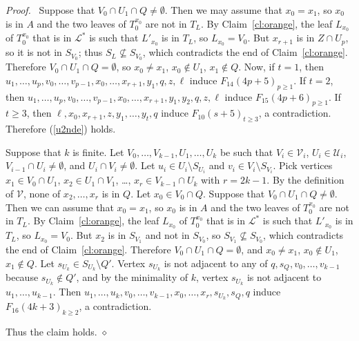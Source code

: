 \documentclass[11pt]{article}
\newenvironment{proofcl}{\noindent \emph{Proof.}\ }{Thus the claim
holds.  \hfill $\diamond$\vspace{1em}}
\begin{document}
\begin{proofcl}
Suppose that $V_0\cap U_1\cap Q\neq\emptyset$.  Then we may assume
that $x_0=x_1$, so $x_0$ is in $A$ and the two leaves of $T_0^{x_0}$
are not in $T_L$.  By Claim~\ref{cl:orange}, the leaf $L_{x_0}$ of
$T_0^{x_0}$ that is in $\mathcal L^*$ is such that $L'_{x_0}$ is in
$T_L$, so $L_{x_0}=V_0$.  But $x_{r+1}$ is in $Z\cap U_p$, so it is
not in $S_{V_0}$; thus $S_L\nsubseteq S_{V_0}$, which contradicts the
end of Claim~\ref{cl:orange}.  Therefore $V_0\cap U_1\cap Q=
\emptyset$, so $x_0\neq x_1$, $x_0\notin U_1$, $x_1\notin Q$.  Now, if
$t=1$, then $u_1, \ldots, u_p, v_0, \ldots, v_{p-1}, x_0, \ldots,
x_{r+1}, y_1, q, z, \ell$ induce $F_{14}(4p+5)_{p\geq 1}$.  If $t=2$,
then $u_1, \ldots, u_p, v_0, \ldots, v_{p-1}, x_0, \ldots, x_{r+1},
y_1, y_2, q, z, \ell$ induce $F_{15}(4p+6)_{p\geq 1}$.  If $t\geq 3$,
then $\ell, x_0, x_{r+1}, z, y_1, \ldots, y_t, q$ induce
$F_{10}(s+5)_{t\geq 3}$, a contradiction.  Therefore (\ref{u2nde})
holds.

\medskip

Suppose that $k$ is finite.  Let $V_0, \ldots, V_{k-1}, U_1, \ldots,
U_k$ be such that $V_i\in\mathcal V_i$, $U_i\in\mathcal U_i$,
$V_{i-1}\cap U_i \neq \emptyset$, and $U_i\cap V_i\neq \emptyset$.
Let $u_i\in U_i \setminus S_{U_i}$ and $v_i \in V_i \setminus
S_{V_i}$.  Pick vertices $x_1\in V_0\cap U_1$, $x_2\in U_1\cap V_1$,
\ldots, $x_r\in V_{k-1}\cap U_k$ with $r=2k-1$.  By the definition of
$\mathcal V$, none of $x_2, \ldots, x_r$ is in $Q$.  Let $x_0\in
V_0\cap Q$.  Suppose that $V_0\cap U_1\cap Q\neq\emptyset$.  Then we
can assume that $x_0=x_1$, so $x_0$ is in $A$ and the two leaves of
$T_0^{x_0}$ are not in $T_L$.  By Claim~\ref{cl:orange}, the leaf
$L_{x_0}$ of $T_0^{x_0}$ that is in $\mathcal L^*$ is such that
$L'_{x_0}$ is in $T_L$, so $L_{x_0}=V_0$.  But $x_2$ is in $S_{V_1}$
and not in $S_{V_0}$, so $S_{V_1}\nsubseteq S_{V_0}$, which
contradicts the end of Claim~\ref{cl:orange}.  Therefore $V_0\cap
U_1\cap Q=\emptyset$, and $x_0\neq x_1$, $x_0\notin U_1$, $x_1\notin
Q$.  Let $s_{U_k}\in S_{U_k}\setminus Q'$.  Vertex $s_{U_k}$ is not
adjacent to any of $q, s_Q, v_0, \ldots, v_{k-1}$ because
$s_{U_k}\notin Q'$, and by the minimality of $k$, vertex $s_{U_k}$ is
not adjacent to $u_1, \ldots, u_{k-1}$.  Then $u_1, \ldots, u_k, v_0,
\ldots, v_{k-1}, x_0, \ldots, x_{r}, s_{U_k}, s_Q, q$ induce
$F_{16}(4k+3)_{k\geq 2}$, a contradiction.


\end{proofcl}
\end{document}
